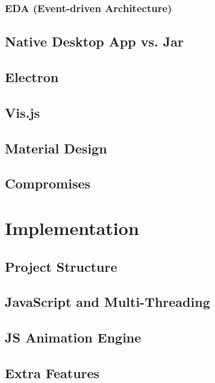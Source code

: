 \documentclass{l4proj}
\begin{document}
\subsection{EDA (Event-driven Architecture)}

\section{Native Desktop App vs. Jar}

\section{Electron}

\section{Vis.js}

\section{Material Design}

\section{Compromises}


\chapter{Implementation}
\label{implementation}

\section{Project Structure}

\section{JavaScript and Multi-Threading}

\section{JS Animation Engine}

\section{Extra Features}
\end{document}
